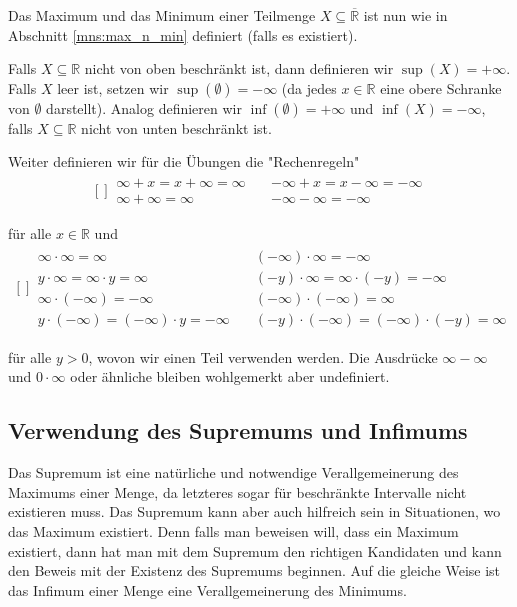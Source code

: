 \documentclass[../Analysis1_script.tex]{subfiles}
\begin{document}
Das Maximum und das Minimum einer Teilmenge $X \subseteq \overline {\mathbb {R}}$ ist nun wie in Abschnitt \ref{mns:max_n_min} definiert (falls es existiert).

Falls $X \subseteq \mathbb {R}$ nicht von oben beschränkt ist, dann definieren wir $\sup (X) = +\infty$. Falls $X$ leer ist, setzen wir $\sup (\emptyset ) = -\infty$ (da jedes $x \in \mathbb {R}$ eine obere Schranke von $\emptyset$ darstellt). Analog definieren wir $\inf (\emptyset ) = +\infty$ und $\inf (X) = -\infty$, falls $X\subseteq \mathbb {R}$ nicht von unten beschränkt ist.

Weiter definieren wir für die Übungen die "Rechenregeln"
\[\begin{aligned}[]
\begin{array}{cc} \infty +x=x+\infty =\infty \quad & -\infty +x=x-\infty =-\infty \\ \infty +\infty =\infty & -\infty -\infty =-\infty 
\end{array}
\end{aligned}\]

für alle $x\in \mathbb {R}$ und
\[\begin{aligned}[]
\begin{array}{cc} \infty \cdot \infty =\infty & (-\infty )\cdot \infty =-\infty \\ y\cdot \infty =\infty \cdot y=\infty & (-y)\cdot \infty = \infty \cdot (-y)=-\infty \\ \infty \cdot (-\infty )=-\infty & (-\infty )\cdot (-\infty )=\infty \\ y\cdot (-\infty )=(-\infty )\cdot y=-\infty \quad & (-y)\cdot (-\infty )=(-\infty )\cdot (-y)=\infty 
\end{array}
\end{aligned}\]

für alle $y>0$, wovon wir einen Teil verwenden werden. Die Ausdrücke $\infty -\infty$ und $0\cdot \infty$ oder ähnliche bleiben wohlgemerkt aber undefiniert.

\subsection{Verwendung des Supremums und Infimums}

Das Supremum ist eine natürliche und notwendige Verallgemeinerung des Maximums einer Menge, da letzteres sogar für beschränkte Intervalle nicht existieren muss. Das Supremum kann aber auch hilfreich sein in Situationen, wo das Maximum existiert. Denn falls man beweisen will, dass ein Maximum existiert, dann hat man mit dem Supremum den richtigen Kandidaten und kann den Beweis mit der Existenz des Supremums beginnen. Auf die gleiche Weise ist das Infimum einer Menge eine Verallgemeinerung des Minimums.
\end{document}

